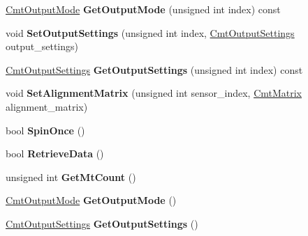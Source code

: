 \begin{DoxyCompactItemize}
\item 
\hypertarget{classxsens_1_1Driver_a8ea8faa3a30cb87f6c879b988c9a4646}{\hyperlink{cmtdef_8h_a85df1cdea0bf11e38292e3cd5d69e747}{\-Cmt\-Output\-Mode} {\bfseries \-Get\-Output\-Mode} (unsigned int index) const }\label{classxsens_1_1Driver_a8ea8faa3a30cb87f6c879b988c9a4646}

\item 
\hypertarget{classxsens_1_1Driver_a6e85c06b86f6a0ff801bc9ab13e13db9}{void {\bfseries \-Set\-Output\-Settings} (unsigned int index, \hyperlink{cmtdef_8h_a4125efede0d0948ee49291165a1d089b}{\-Cmt\-Output\-Settings} output\-\_\-settings)}\label{classxsens_1_1Driver_a6e85c06b86f6a0ff801bc9ab13e13db9}

\item 
\hypertarget{classxsens_1_1Driver_ab20d691280d7136335b14e0b87be7344}{\hyperlink{cmtdef_8h_a4125efede0d0948ee49291165a1d089b}{\-Cmt\-Output\-Settings} {\bfseries \-Get\-Output\-Settings} (unsigned int index) const }\label{classxsens_1_1Driver_ab20d691280d7136335b14e0b87be7344}

\item 
\hypertarget{classxsens_1_1Driver_accc978728d1f66d3c29eb03d7808f00d}{void {\bfseries \-Set\-Alignment\-Matrix} (unsigned int sensor\-\_\-index, \hyperlink{structCmtMatrix}{\-Cmt\-Matrix} alignment\-\_\-matrix)}\label{classxsens_1_1Driver_accc978728d1f66d3c29eb03d7808f00d}

\item 
\hypertarget{classxsens_1_1Driver_a38ce38dd23ff1f24d81ad76df422d2ba}{bool {\bfseries \-Spin\-Once} ()}\label{classxsens_1_1Driver_a38ce38dd23ff1f24d81ad76df422d2ba}

\item 
\hypertarget{classxsens_1_1Driver_ac3d17b16782f4f21a00e81a5cc16b8d0}{bool {\bfseries \-Retrieve\-Data} ()}\label{classxsens_1_1Driver_ac3d17b16782f4f21a00e81a5cc16b8d0}

\item 
\hypertarget{classxsens_1_1Driver_a8e08abdb1ef1c858b0c588631ff3f1e3}{unsigned int {\bfseries \-Get\-Mt\-Count} ()}\label{classxsens_1_1Driver_a8e08abdb1ef1c858b0c588631ff3f1e3}

\item 
\hypertarget{classxsens_1_1Driver_aa41661edec8bdb1f13decdd999f26d1f}{\hyperlink{cmtdef_8h_a85df1cdea0bf11e38292e3cd5d69e747}{\-Cmt\-Output\-Mode} {\bfseries \-Get\-Output\-Mode} ()}\label{classxsens_1_1Driver_aa41661edec8bdb1f13decdd999f26d1f}

\item 
\hypertarget{classxsens_1_1Driver_aa841e918ab6631687c437eaf633362ff}{\hyperlink{cmtdef_8h_a4125efede0d0948ee49291165a1d089b}{\-Cmt\-Output\-Settings} {\bfseries \-Get\-Output\-Settings} ()}\label{classxsens_1_1Driver_aa841e918ab6631687c437eaf633362ff}


\end{DoxyCompactItemize}
